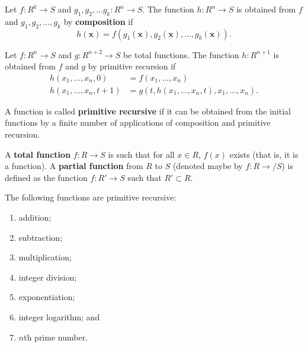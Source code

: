 
\begin{definition}[Composition]
    Let $f: R^k \to S$ and $g_1, g_2, \ldots g_k: R^n \to S$. The function $h: R^n \to S$ is obtained from $f$ and $g_1, g_2, \ldots, g_k$ by \textbf{composition} if
    \[ h(\bm x) = f(g_1(\bm x), g_2(\bm x), \ldots, g_k(\bm x)). \]
\end{definition}

\begin{definition}
    Let $f: R^n \to S$ and $g: R^{n + 2} \to S$ be total functions. The function $h: R^{n + 1}$ is obtained from $f$ and $g$ by primitive recursion if
    \begin{align*}
        h(x_1, \ldots, x_n, 0)     &= f(x_1, \ldots, x_n) \\
        h(x_1, \ldots, x_n, t + 1) &= g(t, h(x_1, \ldots, x_n, t), x_1, \ldots, x_n).
    \end{align*}
\end{definition}

\begin{definition}
    A function is called \textbf{primitive recursive} if it can be obtained from the initial functions by a finite number of applications of composition and primitive recursion.
\end{definition}

\begin{definition}
    A \textbf{total function} $f: R \to S$ is such that for all $x \in R$, $f(x)$ exists (that is, it is a function). A \textbf{partial function} from $R$ to $S$ (denoted maybe by $f: R \to / S$) is defined as the function $f: R' \to S$ such that $R' \subset R$.
\end{definition}

\begin{proposition}[]
    The following functions are primitive recursive:
    \begin{enumerate}
        \item addition;
        \item subtraction;
        \item multiplication;
        \item integer division;
        \item exponentiation;
        \item integer logarithm; and
        \item $n$th prime number.
    \end{enumerate}
\end{proposition}

